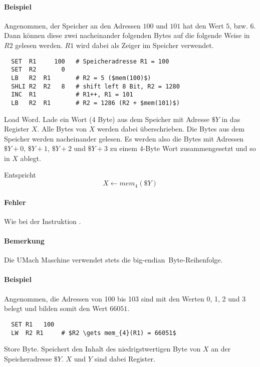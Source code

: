 \paragraph{Beispiel}
Angenommen, der Speicher an den Adressen $100$ und $101$ hat den Wert $5$, bzw.
$6$. Dann können diese zwei nacheinander folgenden Bytes auf die
folgende Weise in $R2$ gelesen werden. $R1$ wird dabei als Zeiger im Speicher
verwendet.
\begin{lstlisting}
  SET  R1     100   # Speicheradresse R1 = 100
  SET  R2       0
  LB   R2  R1       # R2 = 5 ($mem(100)$)
  SHLI R2  R2   8   # shift left 8 Bit, R2 = 1280
  INC  R1           # R1++, R1 = 101
  LB   R2  R1       # R2 = 1286 (R2 + $mem(101)$)
\end{lstlisting}




\glqq Load Word\grqq.
Lade ein Wort (4 Byte) aus dem Speicher mit Adresse $\$Y$ in das Register $X$.
Alle Bytes von $X$ werden dabei überschrieben. Die Bytes aus dem Speicher werden
nacheinander gelesen. Es werden also die Bytes mit Adressen $\$Y + 0$, $\$Y +
1$, $\$Y + 2$ und $\$Y + 3$ zu einem 4-Byte Wort zusammengesetzt und so in $X$
ablegt.

Entspricht 
\[
  X \gets mem_{4}(\$Y)
\]

\paragraph{Fehler}
Wie bei der Instruktion .


\paragraph{Bemerkung}
Die UMach Maschine verwendet stets die \glqq big-endian\grqq\ Byte-Reihenfolge.


\paragraph{Beispiel}
Angenommen, die Adressen von 100 bis 103 sind mit den Werten 0, 1, 2 und 3
belegt und bilden somit den Wert $66051$.
\begin{lstlisting}
  SET R1   100
  LW  R2 R1     # $R2 \gets mem_{4}(R1) = 66051$
\end{lstlisting}




\glqq Store Byte\grqq.
Speichert den Inhalt des niedrigstwertigen Byte von $X$ an der Speicheradresse
$\$Y$. $X$ und $Y$ sind dabei Register.

